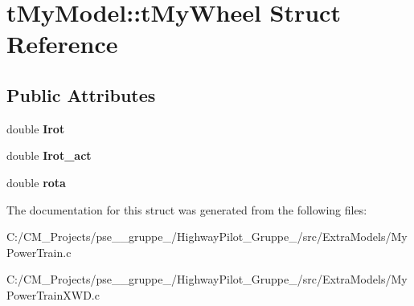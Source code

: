 \hypertarget{structt_my_model_1_1t_my_wheel}{}\section{t\+My\+Model\+::t\+My\+Wheel Struct Reference}
\label{structt_my_model_1_1t_my_wheel}
\subsection*{Public Attributes}
\begin{DoxyCompactItemize}
\item 
\mbox{\label{structt_my_model_1_1t_my_wheel_a261a746b799cbdb4dc2d270059c5eecb}} 
double {\bfseries Irot}
\item 
\mbox{\label{structt_my_model_1_1t_my_wheel_a0efa3aceac459a9a78517a90ec4d5b22}} 
double {\bfseries Irot\+\_\+act}
\item 
\mbox{\label{structt_my_model_1_1t_my_wheel_aa6450721e2652b56c1cd429913627eb7}} 
double {\bfseries rota}
\end{DoxyCompactItemize}


The documentation for this struct was generated from the following files\+:\begin{DoxyCompactItemize}
\item 
C\+:/\+C\+M\+\_\+\+Projects/pse\+\_\+\_\+gruppe\+\_/\+Highway\+Pilot\+\_\+\+Gruppe\+\_/src/\+Extra\+Models/My\+Power\+Train.\+c\item 
C\+:/\+C\+M\+\_\+\+Projects/pse\+\_\+\_\+gruppe\+\_/\+Highway\+Pilot\+\_\+\+Gruppe\+\_/src/\+Extra\+Models/My\+Power\+Train\+X\+W\+D.\+c\end{DoxyCompactItemize}
